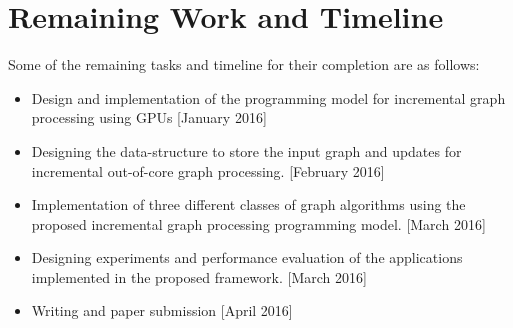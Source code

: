 \chapter{Remaining Work and Timeline}
Some of the remaining tasks and timeline for their completion are as follows:
\begin{itemize}
\item Design and implementation of the programming model for incremental graph processing using GPUs [January 2016]
\item Designing the data-structure to store the input graph and updates for incremental out-of-core graph processing. [February 2016]
\item Implementation of three different classes of graph algorithms using the proposed incremental graph processing programming model. [March 2016]
\item Designing experiments and performance evaluation of the applications implemented in the proposed framework. [March 2016]
\item Writing and paper submission [April 2016]
\end{itemize}

\label{timeline}
